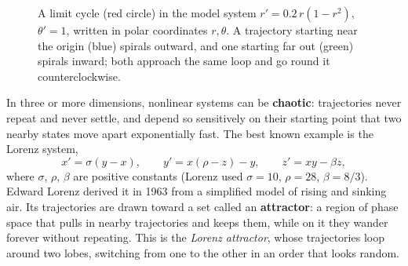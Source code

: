 \begin{figure}[htbp]
\centering
{}
\caption{A limit cycle (red circle) in the model system $r'=0.2\,r(1-r^2)$,
$\theta'=1$, written in polar coordinates $r,\theta$. A trajectory starting
near the origin (blue) spirals outward, and one starting far out (green)
spirals inward; both approach the same loop and go round it counterclockwise.}
\label{ch39:fig-limit-cycle}
\end{figure}

In three or more dimensions, nonlinear systems can be \textbf{chaotic}:
trajectories never repeat and never settle, and depend so sensitively on their
starting point that two nearby states move apart exponentially fast. The best
known example is the Lorenz system,
\[
  x' = \sigma(y-x), \qquad y' = x(\rho - z) - y, \qquad z' = xy - \beta z,
\]
where $\sigma$, $\rho$, $\beta$ are positive constants (Lorenz used $\sigma=10$,
$\rho=28$, $\beta=8/3$). Edward Lorenz derived it in 1963 from a simplified model of
rising and sinking air. Its trajectories are drawn toward a set called
an \textbf{attractor}: a region of phase space that pulls in nearby
trajectories and keeps them, while on it they wander forever without repeating.
This is the \emph{Lorenz attractor}, whose trajectories loop around two
lobes, switching from one to the other in an order that looks random.

